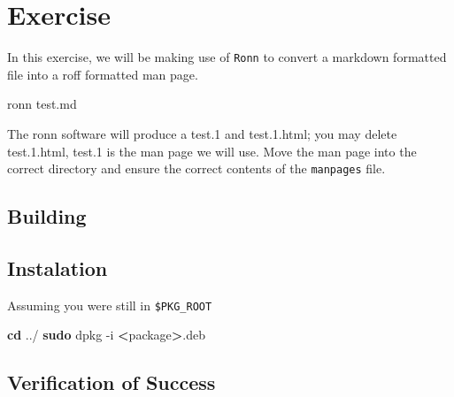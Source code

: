 \documentclass[]{article}
\newenvironment{Shaded}{}{}
\newcommand{\KeywordTok}[1]{\textcolor[rgb]{0.00,0.44,0.13}{\textbf{{#1}}}}
\newcommand{\OtherTok}[1]{\textcolor[rgb]{0.00,0.44,0.13}{{#1}}}
\newcommand{\NormalTok}[1]{{#1}}
\begin{document}
\section{Exercise}

In this exercise, we will be making use of \texttt{Ronn} to convert a
markdown formatted file into a roff formatted man page.

\begin{Shaded}
\begin{Highlighting}[]
\NormalTok{ronn test.md}
\end{Highlighting}
\end{Shaded}
The ronn software will produce a test.1 and test.1.html; you may delete
test.1.html, test.1 is the man page we will use. Move the man page into
the correct directory and ensure the correct contents of the
\texttt{manpages} file.

\begin{Shaded}
\end{Shaded}
\subsection{Building}

\begin{Shaded}
\end{Shaded}
\subsection{Instalation}

Assuming you were still in \texttt{\$PKG\_ROOT}

\begin{Shaded}
\begin{Highlighting}[]
\KeywordTok{cd} \NormalTok{../}
\KeywordTok{sudo} \NormalTok{dpkg -i }\KeywordTok{<}\NormalTok{package}\KeywordTok{>}\NormalTok{.deb}
\end{Highlighting}
\end{Shaded}
\subsection{Verification of Success}
\end{document}
